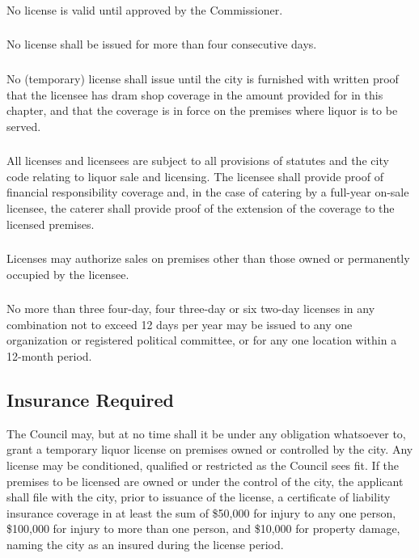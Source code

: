 \subsubsection{}
No license is valid until approved by the Commissioner.
\subsubsection{}
No license shall be issued for more than four consecutive days.
\subsubsection{}
No (temporary) license shall issue until the city is furnished with written proof that the licensee has dram shop coverage in the amount provided for in this chapter, and that the coverage is in force on the premises where liquor is to be served.
\subsubsection{}
All licenses and licensees are subject to all provisions of statutes and the city code relating to liquor sale and licensing.  The licensee shall provide proof of financial responsibility coverage and, in the case of catering by a full-year on-sale licensee, the caterer shall provide proof of the extension of the coverage to the licensed premises.
\subsubsection{}
Licenses may authorize sales on premises other than those owned or permanently occupied by the licensee.
\subsubsection{}
No more than three four-day, four three-day or six two-day licenses in any combination not to exceed 12 days per year may be issued to any one organization or registered political committee, or for any one location within a 12-month period.
\subsection{Insurance Required}
The Council may, but at no time shall it be under any obligation whatsoever to, grant a temporary liquor license on premises owned or controlled by the city.  Any license may be conditioned, qualified or restricted as the Council sees fit.  If the premises to be licensed are owned or under the control of the city, the applicant shall file with the city, prior to issuance of the license, a certificate of liability insurance coverage in at least the sum of \$50,000 for injury to any one person, \$100,000 for injury to more than one person, and \$10,000 for property damage, naming the city as an insured during the license period.\\

